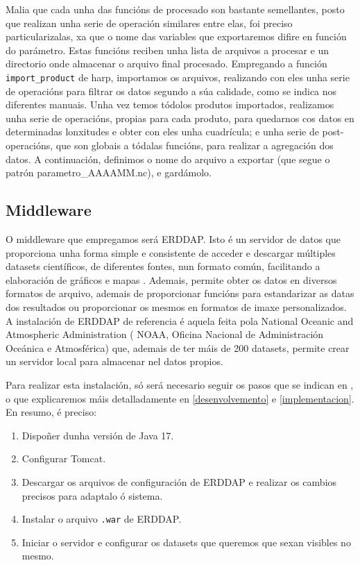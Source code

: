 Malia que cada unha das funcións de procesado son bastante semellantes, posto que realizan unha serie de operación similares entre elas, foi preciso particularizalas, xa que o nome das variables
que exportaremos difire en función do parámetro. Estas funcións reciben unha lista de arquivos a procesar e un directorio onde almacenar o arquivo final procesado. Empregando a función \texttt{
    import\_product} de harp, importamos os arquivos, realizando con eles unha serie de operacións para filtrar os datos segundo a súa calidade, como se indica nos diferentes manuais. Unha vez temos
tódolos produtos importados, realizamos unha serie de operacións, propias para cada produto, para quedarnos cos datos en determinadas lonxitudes e obter con eles unha cuadrícula; e unha serie de
post-operacións, que son globais a tódalas funcións, para realizar a agregación dos datos. A continuación, definimos o nome do arquivo a exportar (que segue o patrón parametro\_AAAAMM.nc), e
gardámolo.

\subsection{Middleware}\label{middleware}
O middleware que empregamos será ERDDAP. Isto é un servidor de datos que proporciona unha forma simple e consistente de acceder e descargar múltiples datasets científicos, de diferentes fontes, nun
formato común, facilitando a elaboración de gráficos e mapas \cite{erddaphome}. Ademais, permite obter os datos en diversos formatos de arquivo, ademais de proporcionar funcións para estandarizar
as datas dos resultados ou proporcionar os mesmos en formatos de imaxe personalizados. A instalación de ERDDAP de referencia é aquela feita pola National Oceanic and Atmospheric Administration (
NOAA, Oficina Nacional de Administración Oceánica e Atmosférica) que, ademais de ter máis de 200 datasets, permite crear un servidor local para almacenar nel datos propios.

Para realizar esta instalación, só será necesario seguir os pasos que se indican en \cite{erddapsetup}, o que explicaremos máis detalladamente en \ref{desenvolvemento} e \ref{implementacion}. En
resumo, é preciso:
\begin{enumerate}
    \item Dispoñer dunha versión de Java 17.
    \item Configurar Tomcat.
    \item Descargar os arquivos de configuración de ERDDAP e realizar os cambios precisos para adaptalo ó sistema.
    \item Instalar o arquivo \texttt{.war} de ERDDAP.
    \item Iniciar o servidor e configurar os datasets que queremos que sexan visibles no mesmo.
\end{enumerate}

